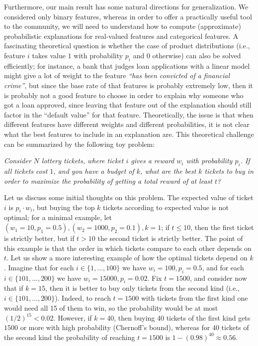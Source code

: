 Furthermore, our    main result has some natural directions for generalization. We considered only binary features, whereas in order to offer a practically useful tool to the community, we will need to understand how to compute (approximate) probabilistic explanations for real-valued features and categorical features. A fascinating theoretical question is whether the case of product distributions (i.e., feature $i$ takes value $1$ with probability $p_i$ and $0$ otherwise) can also be solved efficiently; for instance, a bank that judges loan applications with a linear model might give a lot of weight to the feature \emph{``has been convicted of a financial crime''}, but since the base rate of that features is probably extremely low, then it is probably not a good feature to choose in order to explain why someone who got a loan approved, since leaving that feature out of the explanation should still factor in the ``default value'' for that feature. Theoretically, the issue is that when different features have different weights and different probabilities, it is not clear what the best features to include in an explanation are. This theoretical challenge can be summarized by the following toy problem: 
\begin{center}
\emph{Consider $N$ lottery tickets, where ticket $i$ gives a reward $w_i$ with probability $p_i$. If all tickets cost $1$, and you have a budget of $k$, what are the best $k$ tickets to buy in order to maximize the probability of getting a total reward of at least $t$?}
\end{center}
Let us discuss some initial thoughts on this problem. The expected value of ticket $i$ is $p_i \cdot w_i$, but buying the top $k$ tickets according to expected value is not optimal; for a minimal example, let $(w_1 = 10, p_1 = 0.5), (w_2 = 1000, p_2 = 0.1), k = 1$; if $t  \leq 10$, then the first ticket is strictly better, but if $t > 10$ the second ticket is strictly better. The point of this example is that the order in which tickets compare to each other depends on $t$.
Let us show a more interesting example of how the optimal tickets depend on $k$.
Imagine that for each $i \in \{1, ..., 100\}$ we have $w_i = 100, p_i = 0.5$, and for each $i \in \{101, ..., 200\}$ we have $w_i = 15000, p_i = 0.02$. Fix $t = 1500$, and consider now that if $k = 15$, then it is better to buy only tickets from the second kind (i.e., $i \in \{101, \ldots, 200\}$). Indeed, to reach $t=1500$ with tickets from the first kind one would need all 15 of them to win, so the probability would be at most $(1/2)^{15} < 0.02$. However, if $k = 40$, then buying 40 tickets of the first kind gets $1500$ or more with high probability (Chernoff's bound), whereas for 40 tickets of the second kind the probability of reaching $t = 1500$ is $1 - (0.98)^{40} \approx 0.56$.
